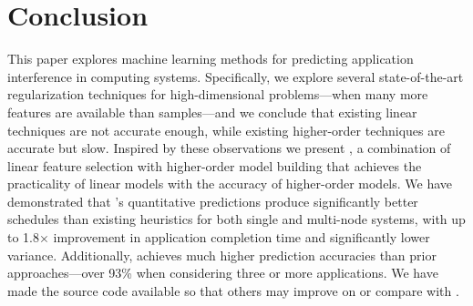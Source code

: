 \section{Conclusion}
This paper explores machine learning methods for predicting
application interference in computing systems.  Specifically, we
explore several state-of-the-art regularization techniques for
high-dimensional problems---when many more features are available than
samples---and we conclude that existing linear techniques are not
accurate enough, while existing higher-order techniques are accurate
but slow.  Inspired by these observations we present \SYSTEM{}, a
combination of linear feature selection with higher-order model
building that achieves the practicality of linear models with the
accuracy of higher-order models.  We have demonstrated that
\SYSTEM{}'s quantitative predictions produce significantly better
schedules than existing heuristics for both single and multi-node
systems, with up to 1.8$\times$ improvement in application completion
time and significantly lower variance.  Additionally, \SYSTEM{}
achieves much higher prediction accuracies than prior
approaches---over 93\% when considering three or more applications.
We have made the source code available so that others may improve on
or compare with \SYSTEM{}.
